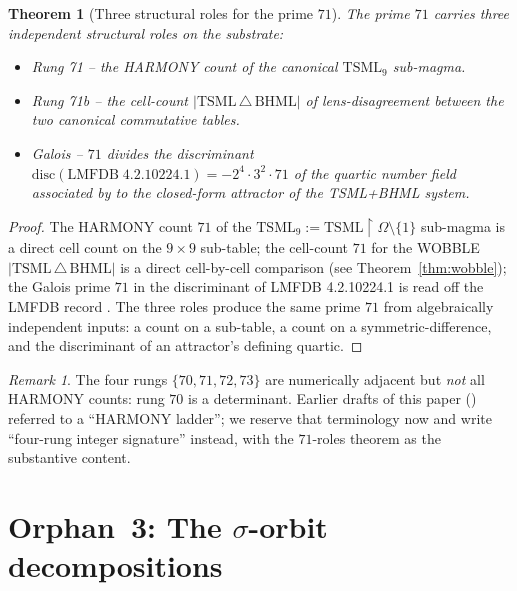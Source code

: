 \documentclass[11pt,reqno]{amsart}
\theoremstyle{plain}
\newtheorem{theorem}{Theorem}[section]
\theoremstyle{definition}
\theoremstyle{remark}
\newtheorem*{remark}{Remark}
\newcommand{\TSML}{\mathrm{TSML}}
\newcommand{\BHML}{\mathrm{BHML}}
\begin{document}
\begin{theorem}[Three structural roles for the prime $71$]
\label{thm:71-roles}
The prime $71$ carries three independent structural roles on the
substrate:
\begin{itemize}[leftmargin=2em]
\item Rung 71 -- the HARMONY count of the canonical $\TSML_9$
sub-magma.
\item Rung 71b -- the cell-count $|\TSML\,\triangle\,\BHML|$
of lens-disagreement between the two canonical commutative tables.
\item Galois -- $71$ divides the discriminant
$\mathrm{disc}(\mathrm{LMFDB}\;4.2.10224.1) = -2^4\cdot 3^2 \cdot 71$
of the quartic number field associated by
\cite{SandersGishFourCore} to the closed-form attractor of the
TSML+BHML system.
\end{itemize}
\end{theorem}

\begin{proof}
The HARMONY count $71$ of the $\TSML_9 := \TSML\!\restriction\!\Omega
\setminus\{1\}$ sub-magma is a direct cell count on the
$9\times 9$ sub-table; the cell-count $71$ for the WOBBLE
$|\TSML\,\triangle\,\BHML|$ is a direct cell-by-cell comparison
(see Theorem~\ref{thm:wobble}); the Galois prime $71$ in the
discriminant of LMFDB 4.2.10224.1 is read off the LMFDB record
\cite{LMFDB}. The three roles produce the same prime $71$ from
algebraically independent inputs: a count on a sub-table, a count
on a symmetric-difference, and the discriminant of an attractor's
defining quartic.
\end{proof}

\begin{remark}
The four rungs $\{70,71,72,73\}$ are numerically adjacent but
\emph{not} all HARMONY counts: rung $70$ is a determinant. Earlier
drafts of this paper (\cite{SandersForcingOld}) referred to a
``HARMONY ladder''; we reserve that terminology now and write
``four-rung integer signature'' instead, with the $71$-roles theorem
as the substantive content.
\end{remark}

\section{Orphan~3: The $\sigma$-orbit decompositions}
\label{sec:cycle-skeleton}
\end{document}
